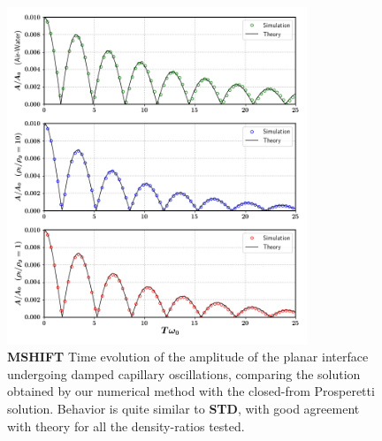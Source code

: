 \begin{figure}[h!]
    \centering
    \includegraphics[width = 0.8\textwidth]{plots/capwave/compare_daniel.png}
	\caption{\textbf{MSHIFT} Time evolution of the amplitude of the planar interface undergoing damped capillary oscillations, comparing the solution obtained by our numerical method with the closed-from Prosperetti solution. Behavior is quite similar to \textbf{STD}, with good agreement with theory for all the density-ratios tested. }
    \label{capwave_daniel}
\end{figure}

